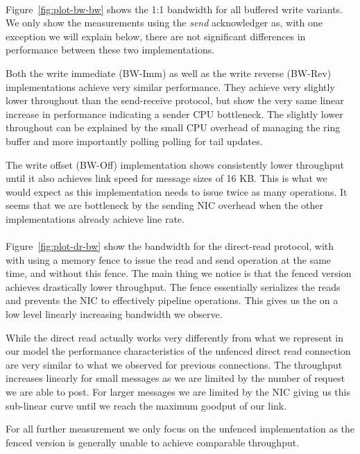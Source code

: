 \paragraph{} Figure~\ref{fig:plot-bw-bw} shows the 1:1 bandwidth for all buffered write variants. We only show the measurements
using the \emph{send} acknowledger as, with one exception we will explain below, there are not significant differences
in performance between these two implementations.

Both the write immediate (BW-Imm) as well
as the write reverse (BW-Rev) implementations achieve very similar performance. They achieve very slightly lower throughout
than the send-receive protocol, but show the very same linear increase in performance indicating a sender CPU bottleneck. The
slightly lower throughout can be explained by the small CPU overhead of managing the ring buffer and more importantly polling 
polling for tail updates.

The write offset (BW-Off) implementation shows consistently lower throughput until it also achieves
link speed for message sizes of 16 KB. This is what we would expect as this implementation needs to issue 
twice as many operations. It seems that we are bottleneck by the sending NIC overhead when the other
implementations already achieve line rate.

\paragraph{} Figure~\ref{fig:plot-dr-bw} show the bandwidth for the direct-read protocol, with with using a memory fence
to issue the read and send operation at the same time, and without this fence.  The main thing we notice is that the 
fenced version achieves drastically lower throughput. The fence essentially serializes the reads and prevents the NIC 
to effectively pipeline operations. This gives us the on a low level linearly increasing bandwidth we observe.

While the direct read actually works very differently from what we represent in our model the performance 
characteristics of the unfenced direct read connection are very similar to what we observed for previous connections. The
throughput increases linearly for small messages as we are limited by the number of request we are able to post. For larger
messages we are limited by the NIC giving us this sub-linear curve until we reach the maximum goodput of our link.

For all further measurement we only focus on the unfenced implementation as the fenced version is generally unable
to achieve comparable throughput.



